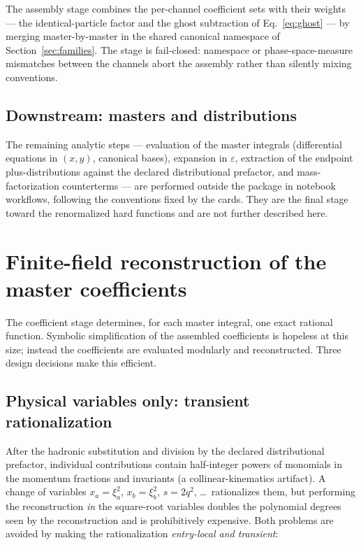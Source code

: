 \documentclass[11pt]{article}
\newcommand{\eps}{\varepsilon}
\begin{document}
The assembly stage combines the per-channel coefficient sets with
their weights --- the identical-particle factor and the ghost
subtraction of Eq.~\eqref{eq:ghost} --- by merging master-by-master in
the shared canonical namespace of Section~\ref{sec:families}.  The
stage is fail-closed: namespace or phase-space-measure mismatches
between the channels abort the assembly rather than silently mixing
conventions.

\subsection{Downstream: masters and distributions}

The remaining analytic steps --- evaluation of the master integrals
(differential equations in $(x,y)$, canonical bases), expansion in
$\eps$, extraction of the endpoint plus-distributions against the
declared distributional prefactor, and mass-factorization
counterterms --- are performed outside the package in notebook
workflows, following the conventions fixed by the cards.  They are the
final stage toward the renormalized hard functions and are not further
described here.

\section{Finite-field reconstruction of the master coefficients}
\label{sec:coefficients}

The coefficient stage determines, for each master integral, one exact
rational function.  Symbolic simplification of the assembled
coefficients is hopeless at this size; instead the coefficients are
evaluated modularly and reconstructed.  Three design decisions make
this efficient.

\subsection{Physical variables only: transient rationalization}
\label{sec:rationalization}

After the hadronic substitution and division by the declared
distributional prefactor, individual contributions contain
half-integer powers of monomials in the momentum fractions and
invariants (a collinear-kinematics artifact).  A change of variables
$x_a = \xi_a^2$, $x_b = \xi_b^2$, $s = 2q^2$, \dots\ rationalizes
them, but performing the reconstruction \emph{in} the square-root
variables doubles the polynomial degrees seen by the reconstruction
and is prohibitively expensive.  Both problems are avoided by making
the rationalization \emph{entry-local and transient}:
\end{document}
